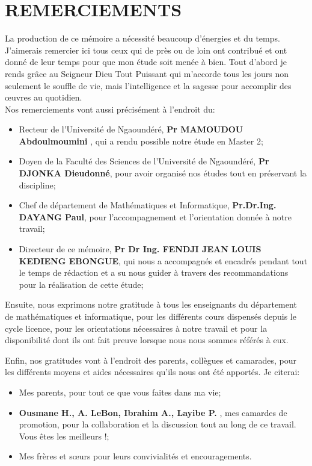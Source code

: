 \chapter*{REMERCIEMENTS}
La production de ce mémoire a nécessité beaucoup d’énergies et du temps. J’aimerais remercier ici tous ceux qui de près ou de loin ont contribué et ont donné de leur temps pour que mon étude soit menée à bien. Tout d'abord je rends gr\^ace au Seigneur Dieu Tout Puissant qui m'accorde tous les jours non seulement le souffle de vie, mais l'intelligence et la sagesse pour accomplir des \oe uvres au quotidien. \\
Nos remerciements  vont aussi précisément à l'endroit du:
\begin{itemize}
	\item  Recteur de l'Université de Ngaoundéré,  {\footnotesize\bfseries Pr MAMOUDOU Abdoulmoumini} , qui a rendu possible notre étude en Master 2;
	\item  Doyen de la Faculté des Sciences de l'Université de Ngaoundéré, {\footnotesize\bfseries Pr DJONKA Dieudonné}, pour avoir organisé nos études tout en préservant la discipline;
	\item Chef de département de Mathématiques et Informatique,  { \footnotesize\bfseries Pr.Dr.Ing. DAYANG Paul}, pour l'accompagnement et l'orientation donnée à notre travail;
	\item Directeur de ce mémoire,  {\footnotesize\bfseries Pr Dr Ing. FENDJI JEAN LOUIS KEDIENG EBONGUE}, qui nous a accompagnés et encadrés pendant tout le temps de rédaction et a su nous guider à travers des recommandations pour la réalisation de cette étude;
\end{itemize}
\par Ensuite, nous exprimons notre gratitude à tous les enseignants du département de mathématiques et informatique, pour
les différents cours dispensés depuis le cycle licence, pour les orientations nécessaires à notre travail et pour la disponibilité dont ils ont fait preuve lorsque nous nous sommes référés à eux.
\par Enfin, nos gratitudes vont à l'endroit des parents, collègues et camarades, pour les différents moyens et aides nécessaires qu'ils nous ont été apportés. Je citerai:
\begin{itemize}
	\item  Mes parents, pour tout ce que vous faites dans ma vie;
	\item {\footnotesize \bfseries Ousmane H., A. LeBon, Ibrahim A., Layibe P. }, mes camardes de promotion, pour la collaboration et la discussion tout au long de ce travail. Vous êtes les meilleurs !;
	\item   Mes frères et s\oe urs pour leurs convivialités et encouragements.
\end{itemize}


